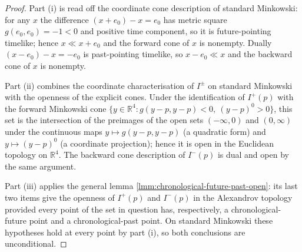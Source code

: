 \begin{proof}
    \leanok
    Part (i) is read off the coordinate cone description of standard Minkowski: for any $x$ the difference $(x + e_0) - x = e_0$ has metric square $g(e_0, e_0) = -1 < 0$ and positive time component, so it is future-pointing timelike; hence $x \ll x + e_0$ and the forward cone of $x$ is nonempty. Dually $(x - e_0) - x = -e_0$ is past-pointing timelike, so $x - e_0 \ll x$ and the backward cone of $x$ is nonempty.

    Part (ii) combines the coordinate characterisation of $I^\pm$ on standard Minkowski with the openness of the explicit cones. Under the identification of $I^+(p)$ with the forward Minkowski cone $\{y \in \mathbb{R}^4 : g(y - p, y - p) < 0,\ (y - p)^0 > 0\}$, this set is the intersection of the preimages of the open sets $(-\infty, 0)$ and $(0, \infty)$ under the continuous maps $y \mapsto g(y - p, y - p)$ (a quadratic form) and $y \mapsto (y - p)^0$ (a coordinate projection); hence it is open in the Euclidean topology on $\mathbb{R}^4$. The backward cone description of $I^-(p)$ is dual and open by the same argument.

    Part (iii) applies the general lemma \ref{lmm:chronological-future-past-open}: its last two items give the openness of $I^+(p)$ and $I^-(p)$ in the Alexandrov topology provided every point of the set in question has, respectively, a chronological-future point and a chronological-past point. On standard Minkowski these hypotheses hold at every point by part (i), so both conclusions are unconditional.
\end{proof}

\medskip

